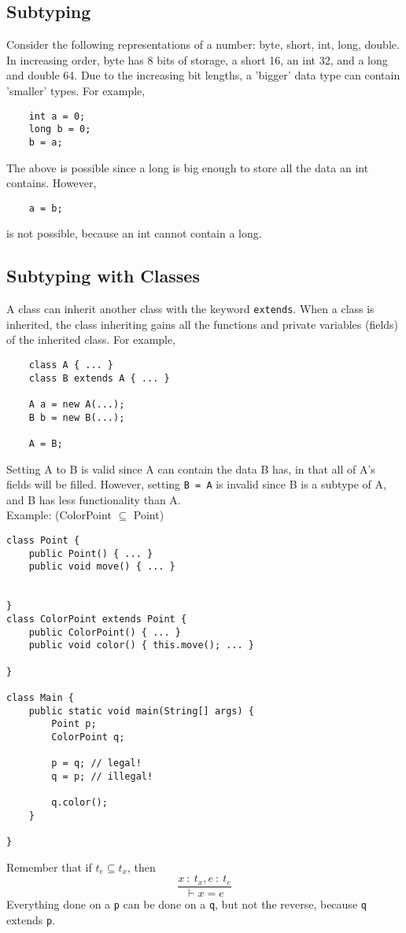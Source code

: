 \documentclass[10pt]{article}
\begin{document}
\subsection*{Subtyping}
Consider the following representations of a number: byte, short, int, long, double.  In increasing order, byte has 8 bits of storage, a short 16, an int 32, and a long and double 64.  Due to the increasing bit lengths, a 'bigger' data type can contain 'smaller' types.  For example,
\begin{verbatim}
    int a = 0;
    long b = 0;
    b = a;
\end{verbatim} 
The above is possible since a long is big enough to store all the data an int contains.  However,
\begin{verbatim}
    a = b;
\end{verbatim}
is not possible, because an int cannot contain a long.
\subsection*{Subtyping with Classes}
A class can inherit another class with the keyword \texttt{extends}.  When a class is inherited, the class inheriting gains all the functions and private variables (fields) of the inherited class.  For example,
\begin{verbatim}
    class A { ... }
    class B extends A { ... }
    
    A a = new A(...);
    B b = new B(...);

    A = B;
\end{verbatim}
Setting A to B is valid since A can contain the data B has, in that all of A's fields will be filled.  However, setting \texttt{B = A} is invalid since B is a subtype of A, and B has less functionality than A.\\
Example: (ColorPoint $\subseteq$ Point)
\begin{verbatim}
class Point {
    public Point() { ... }
    public void move() { ... }


}
class ColorPoint extends Point {
    public ColorPoint() { ... }
    public void color() { this.move(); ... }

}

class Main {
    public static void main(String[] args) {
        Point p;
        ColorPoint q;

        p = q; // legal!
        q = p; // illegal!

        q.color();
    }

}
\end{verbatim}
Remember that if $t_e \subseteq t_x$, then
\[\frac{x \::\: t_x, e \::\: t_e}{\vdash x = e}\]
Everything done on a \texttt{p} can be done on a \texttt{q}, but not the reverse, because \texttt{q} extends \texttt{p}.
\end{document}
